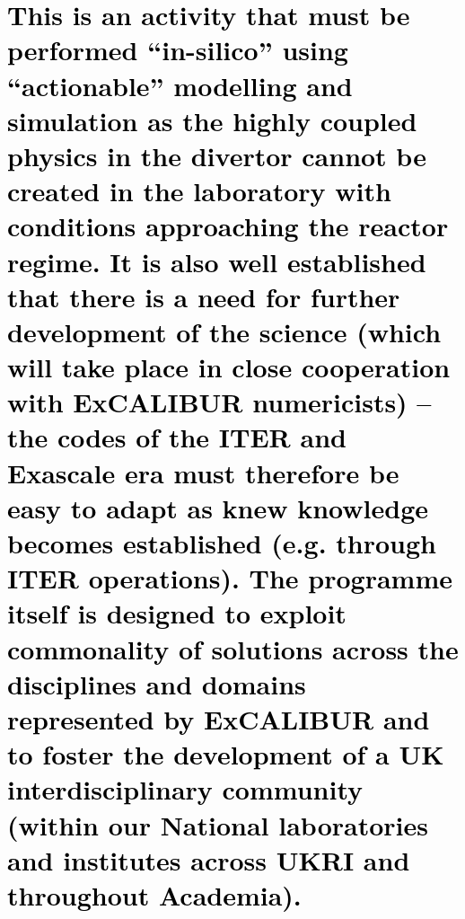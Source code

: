 \documentclass[a4paper]{article}
\begin{document}
\section[This is an activity that must be performed {}``in{}-silico{}'' using {}``actionable{}'' modelling and
simulation as the highly coupled physics in the divertor cannot be created in the laboratory with conditions
approaching the reactor regime. It is also well established that there is a need for further development of the science
(which will take place in close cooperation with ExCALIBUR numericists) {}-- the codes of the ITER and Exascale era
must therefore be easy to adapt as knew knowledge becomes established (e.g. through ITER operations). The programme
itself is designed to exploit commonality of solutions across the disciplines and domains represented by ExCALIBUR and
to foster the development of a UK interdisciplinary community (within our National laboratories and institutes across
UKRI and throughout Academia).]{\textmd{\textcolor{black}{This is an activity that must be performed ``in-silico''
using ``actionable'' modelling and simulation as the highly coupled physics in the divertor cannot be created in the
laboratory with conditions approaching the reactor regime. It is also well established that there is a need for further
development of the science (which will take place in close cooperation with ExCALIBUR numericists) -- the codes of the
ITER and Exascale era must therefore be easy to adapt as knew knowledge becomes established (e.g. through ITER
operations). The programme itself is designed to exploit commonality of solutions across the disciplines and domains
represented by ExCALIBUR and to foster the development of a UK interdisciplinary community (within our National
laboratories and institutes across UKRI and throughout Academia).}}}

\bigskip
\end{document}
